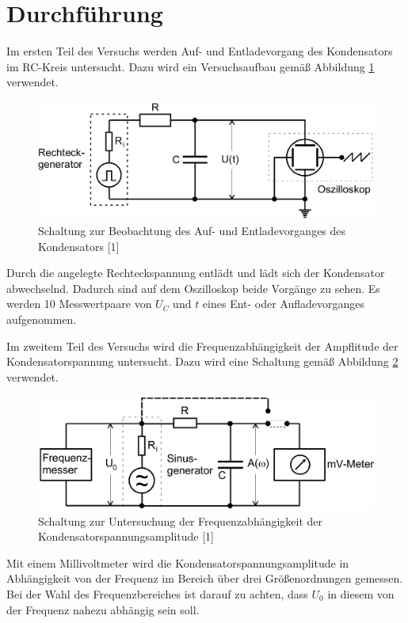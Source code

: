 \section{Durchführung}
\label{sec:Durchführung}

Im ersten Teil des Versuchs werden Auf- und Entladevorgang des Kondensators
im RC-Kreis untersucht. Dazu wird ein Versuchsaufbau gemäß Abbildung \ref{fig:aufbau1}
verwendet. 

\begin{figure}
\centering
\includegraphics[scale=0.2]{content/aufbau1.png}
\caption{Schaltung zur Beobachtung des Auf- und Entladevorganges des Kondensators [1]}
\label{fig:aufbau1}
\end{figure}

Durch die angelegte Rechteckspannung entlädt und lädt sich der Kondensator 
abwechselnd. Dadurch sind auf dem Oszilloskop beide Vorgänge zu sehen. Es 
werden 10 Messwertpaare von $U_C$ und $t$ eines Ent- oder Aufladevorganges
aufgenommen.  

Im zweitem Teil des Versuchs wird die Frequenzabhängigkeit der Ampflitude der 
Kondensatorspannung untersucht. Dazu wird eine Schaltung gemäß Abbildung \ref{fig:aufbau2}
verwendet. 

\begin{figure}
\centering
\includegraphics[scale=0.2]{content/aufbau2.png}
\caption{Schaltung zur Untersuchung der Frequenzabhängigkeit der Kondensatorspannungsamplitude [1]}
\label{fig:aufbau2}
\end{figure}

Mit einem Millivoltmeter wird die Kondensatorspannungsamplitude in Abhängigkeit von 
der Frequenz im Bereich über drei Größenordnungen gemessen. Bei der Wahl des 
Frequenzbereiches ist darauf zu achten, dass $U_0$ in diesem von der Frequenz 
nahezu abhängig sein soll. 

